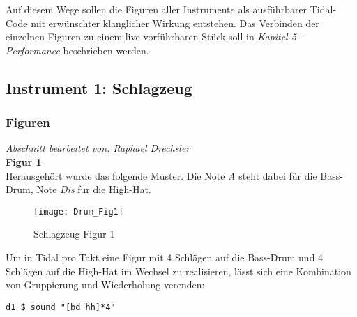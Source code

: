 \documentclass[
10pt, %
a4paper, %
oneside, %
headinclude,footinclude, %
BCOR5mm, %
]{scrartcl}
\begin{document}
\noindent Auf diesem Wege sollen die Figuren aller Instrumente als ausführbarer Tidal-Code mit erwünschter klanglicher Wirkung entstehen.
Das Verbinden der einzelnen Figuren zu einem live vorführbaren Stück soll in \textit{Kapitel 5 - Performance} beschrieben werden. 


%
%
%

\subsection{Instrument 1: Schlagzeug}
\subsubsection{Figuren}
\textit{Abschnitt bearbeitet von: Raphael Drechsler}\\

\noindent \textbf{Figur 1}\\
Herausgehört wurde das folgende Muster. Die Note \textit{A} steht dabei für die Bass-Drum, Note \textit{Dis} für die High-Hat.
\begin{figure}[h]
	\centering 
	\texttt{[image: Drum\_Fig1]} 
	\caption{Schlagzeug Figur 1}
\end{figure}

\noindent Um in Tidal pro Takt eine Figur mit 4 Schlägen auf die Bass-Drum und 4 Schlägen auf die High-Hat im Wechsel zu realisieren, lässt sich eine Kombination von Gruppierung und Wiederholung\cite{tid1} verenden:
\begin{lstlisting}
d1 $ sound "[bd hh]*4"
\end{lstlisting}
\end{document}
